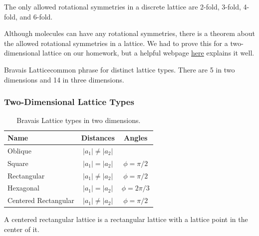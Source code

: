\begin{theorem}
The only allowed rotational symmetries in a discrete lattice are 2-fold, 3-fold, 4-fold, and 6-fold.
\end{theorem}
Although molecules can have any rotational symmetries, there is a theorem about the allowed rotational symmetries in a lattice. We had to prove this for a two-dimensional lattice on our homework, but a helpful webpage \href{http://www.xtal.iqfr.csic.es/Cristalografia/parte_03_1_1-en.html}{here} explains it well.

\begin{definition}
{Bravais Lattice}{common phrase for distinct lattice types. There are 5 in two dimensions and 14 in three dimensions.}
\end{definition}

\subsubsection{Two-Dimensional Lattice Types}
\begin{table}[h]
    \centering
    \begin{tabular}{l|c|c}
        \textbf{Name} & \textbf{Distances} & \textbf{Angles} \\
        \hline
        Oblique      & $|a_1|\neq |a_2|$ & \\
        Square       & $|a_1|=|a_2|$     & $\phi=\pi/2$ \\
        Rectangular  & $|a_1|\neq |a_2|$ & $\phi=\pi/2$ \\
        Hexagonal    & $|a_1|=|a_2|$     & $\phi=2\pi/3$ \\
        Centered Rectangular  & $|a_1|\neq |a_2|$ & $\phi=\pi/2$
    \end{tabular}
    \caption{Bravais Lattice types in two dimensions.}
    \label{tab:2d-bravais}
\end{table}
A centered rectangular lattice is a rectangular lattice with a lattice point in the center of it.

